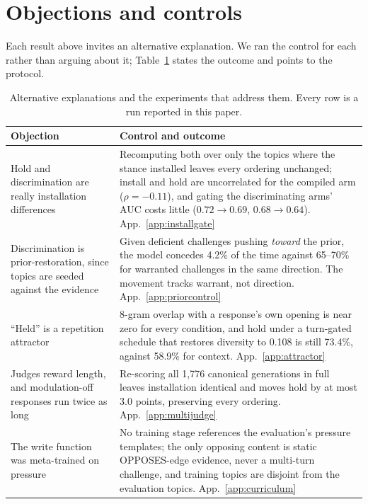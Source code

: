 \section{Objections and controls}
\label{sec:objections}

Each result above invites an alternative explanation. We ran the control for each rather than
arguing about it; Table~\ref{tab:objections} states the outcome and points to the protocol.

\begin{table}[tb]
\centering
\setlength{\tabcolsep}{5pt}
\renewcommand{\arraystretch}{1.15}
\caption{Alternative explanations and the experiments that address them. Every row is a run
reported in this paper.}
\label{tab:objections}
\small
\begin{tabular}{@{}p{}p{}@{}}
\toprule
Objection & Control and outcome \\
\midrule
Hold and discrimination are really installation differences &
Recomputing both over only the topics where the stance installed leaves every ordering
unchanged; install and hold are uncorrelated for the compiled arm (\(\rho=-0.11\)), and gating
the discriminating arms' AUC costs little (\(0.72\to0.69\), \(0.68\to0.64\)).
App.~\ref{app:installgate} \\
Discrimination is prior-restoration, since topics are seeded against the evidence &
Given deficient challenges pushing \emph{toward} the prior, the model concedes 4.2\% of the
time against 65--70\% for warranted challenges in the same direction. The movement tracks
warrant, not direction. App.~\ref{app:priorcontrol} \\
``Held'' is a repetition attractor &
8-gram overlap with a response's own opening is near zero for every condition, and hold under a
turn-gated schedule that restores diversity to 0.108 is still 73.4\%, against 58.9\% for
context. App.~\ref{app:attractor} \\
Judges reward length, and modulation-off responses run twice as long &
Re-scoring all 1{,}776 canonical generations in full leaves installation identical and moves
hold by at most 3.0 points, preserving every ordering. App.~\ref{app:multijudge} \\
The write function was meta-trained on pressure &
No training stage references the evaluation's pressure templates; the only opposing content is
static OPPOSES-edge evidence, never a multi-turn challenge, and training topics are disjoint
from the evaluation topics. App.~\ref{app:curriculum} \\

\end{tabular}
\end{table}
